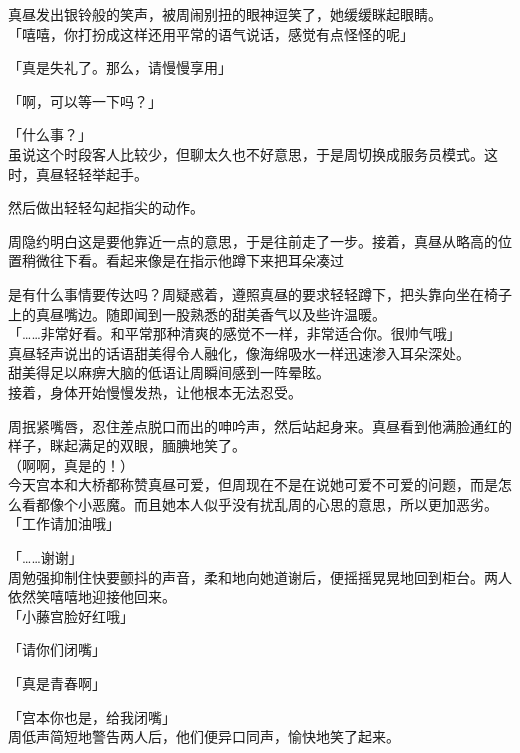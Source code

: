 真昼发出银铃般的笑声，被周闹别扭的眼神逗笑了，她缓缓眯起眼睛。\\

「嘻嘻，你打扮成这样还用平常的语气说话，感觉有点怪怪的呢」

「真是失礼了。那么，请慢慢享用」

「啊，可以等一下吗？」

「什么事？」\\

虽说这个时段客人比较少，但聊太久也不好意思，于是周切换成服务员模式。这时，真昼轻轻举起手。

然后做出轻轻勾起指尖的动作。

周隐约明白这是要他靠近一点的意思，于是往前走了一步。接着，真昼从略高的位置稍微往下看。看起来像是在指示他蹲下来把耳朵凑过

是有什么事情要传达吗？周疑惑着，遵照真昼的要求轻轻蹲下，把头靠向坐在椅子上的真昼嘴边。随即闻到一股熟悉的甜美香气以及些许温暖。\\

「……非常好看。和平常那种清爽的感觉不一样，非常适合你。很帅气哦」\\

真昼轻声说出的话语甜美得令人融化，像海绵吸水一样迅速渗入耳朵深处。\\

甜美得足以麻痹大脑的低语让周瞬间感到一阵晕眩。\\

接着，身体开始慢慢发热，让他根本无法忍受。

周抿紧嘴唇，忍住差点脱口而出的呻吟声，然后站起身来。真昼看到他满脸通红的样子，眯起满足的双眼，腼腆地笑了。\\

（啊啊，真是的！）\\

今天宫本和大桥都称赞真昼可爱，但周现在不是在说她可爱不可爱的问题，而是怎么看都像个小恶魔。而且她本人似乎没有扰乱周的心思的意思，所以更加恶劣。\\

「工作请加油哦」

「……谢谢」\\

周勉强抑制住快要颤抖的声音，柔和地向她道谢后，便摇摇晃晃地回到柜台。两人依然笑嘻嘻地迎接他回来。\\

「小藤宫脸好红哦」

「请你们闭嘴」

「真是青春啊」

「宫本你也是，给我闭嘴」\\

周低声简短地警告两人后，他们便异口同声，愉快地笑了起来。\\
